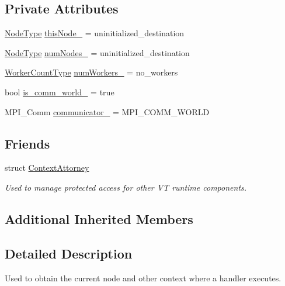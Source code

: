 \subsection*{Private Attributes}
\begin{DoxyCompactItemize}
\item 
\hyperlink{namespacevt_a866da9d0efc19c0a1ce79e9e492f47e2}{Node\+Type} \hyperlink{structvt_1_1ctx_1_1_context_a5fcea79d2fede6e9945433621894624c}{this\+Node\+\_\+} = uninitialized\+\_\+destination
\item 
\hyperlink{namespacevt_a866da9d0efc19c0a1ce79e9e492f47e2}{Node\+Type} \hyperlink{structvt_1_1ctx_1_1_context_a58cc20215314e915f43b829ad0470299}{num\+Nodes\+\_\+} = uninitialized\+\_\+destination
\item 
\hyperlink{namespacevt_aa93398ea48f2cb6c188512250f7cc248}{Worker\+Count\+Type} \hyperlink{structvt_1_1ctx_1_1_context_a16e8488c6e6ad26c387ad6ef19f726b9}{num\+Workers\+\_\+} = no\+\_\+workers
\item 
bool \hyperlink{structvt_1_1ctx_1_1_context_afe6c05b957670f03ef2a278da031a5c4}{is\+\_\+comm\+\_\+world\+\_\+} = true
\item 
M\+P\+I\+\_\+\+Comm \hyperlink{structvt_1_1ctx_1_1_context_ac9f5afa2cb9a6c06c8570bbf25cde926}{communicator\+\_\+} = M\+P\+I\+\_\+\+C\+O\+M\+M\+\_\+\+W\+O\+R\+LD
\end{DoxyCompactItemize}
\subsection*{Friends}
\begin{DoxyCompactItemize}
\item 
struct \hyperlink{structvt_1_1ctx_1_1_context_a75c33a90ea59b21ab5375343af0f8e26}{Context\+Attorney}
\begin{DoxyCompactList}\small\item\em Used to manage protected access for other VT runtime components. \end{DoxyCompactList}\end{DoxyCompactItemize}
\subsection*{Additional Inherited Members}


\subsection{Detailed Description}
Used to obtain the current node and other context where a handler executes. 

